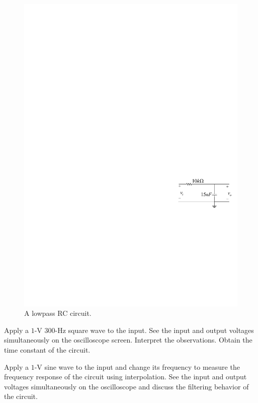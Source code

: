 \documentclass[11pt]{article}
\begin{document}
\begin{question}


    \begin{figure}[H]
        \centering
        \includegraphics[scale=1.2,angle=0]{Fig/cir2.pdf}
        \caption{A lowpass RC circuit.} \label{fig:cir2}
    \end{figure}

    \begin{subquestion}{Apply a $1$-V $300$-Hz square wave to the input. See the input and output voltages simultaneously on the oscilloscope screen. Interpret the observations. Obtain the time constant of the circuit.}
        \answer{}
    \end{subquestion}

    \begin{subquestion}{Apply a $1$-V sine wave to the input and change its frequency to measure the frequency response of the circuit using interpolation. See the input and output voltages simultaneously on the oscilloscope and discuss the filtering behavior of the circuit.}
        \answer{}
    \end{subquestion}


\end{question}
\end{document}
